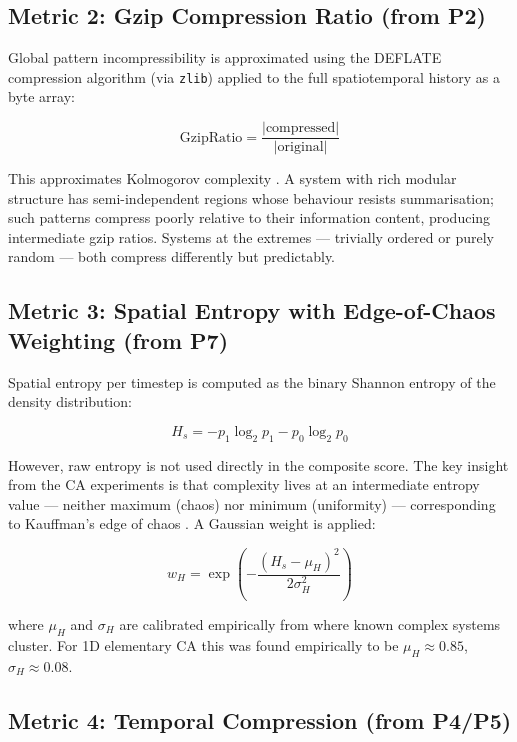 \documentclass[12pt,a4paper]{article}
\begin{document}
\subsection{Metric 2: Gzip Compression Ratio (from P2)}

Global pattern incompressibility is approximated using the DEFLATE
compression algorithm (via \texttt{zlib}) applied to the full
spatiotemporal history as a byte array:

\begin{equation}
\text{GzipRatio} = \frac{|\text{compressed}|}{|\text{original}|}
\end{equation}

This approximates Kolmogorov complexity \citep{kolmogorov1965}.
A system with rich modular structure has semi-independent regions whose
behaviour resists summarisation; such patterns compress poorly relative
to their information content, producing intermediate gzip ratios.
Systems at the extremes — trivially ordered or purely random — both
compress differently but predictably.

\subsection{Metric 3: Spatial Entropy with Edge-of-Chaos Weighting (from P7)}

Spatial entropy per timestep is computed as the binary Shannon entropy
of the density distribution:

\begin{equation}
H_s = -p_1 \log_2 p_1 - p_0 \log_2 p_0
\end{equation}

However, raw entropy is not used directly in the composite score.
The key insight from the CA experiments is that complexity lives at an
intermediate entropy value — neither maximum (chaos) nor minimum
(uniformity) — corresponding to Kauffman's edge of chaos
\citep{kauffman1993}.
A Gaussian weight is applied:

\begin{equation}
w_H = \exp\!\left(-\frac{(H_s - \mu_H)^2}{2\sigma_H^2}\right)
\end{equation}

where $\mu_H$ and $\sigma_H$ are calibrated empirically from where
known complex systems cluster.
For 1D elementary CA this was found empirically to be
$\mu_H \approx 0.85$, $\sigma_H \approx 0.08$.

\subsection{Metric 4: Temporal Compression (from P4/P5)}
\end{document}
